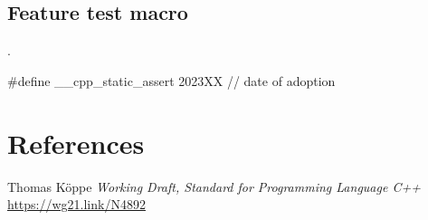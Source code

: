 \documentclass{wg21}
\begin{document}
\subsection{Feature test macro}

.

\begin{addedblock}
\begin{codeblock}
#define __cpp_static_assert 2023XX // date of adoption
\end{codeblock}
\end{addedblock}

\section{References}

\renewcommand{\section}[2]{}%



\begin{thebibliography}{9}

Thomas Köppe
\emph{Working Draft, Standard for Programming Language C++}\newline
\url{https://wg21.link/N4892}


\end{thebibliography}
\end{document}
